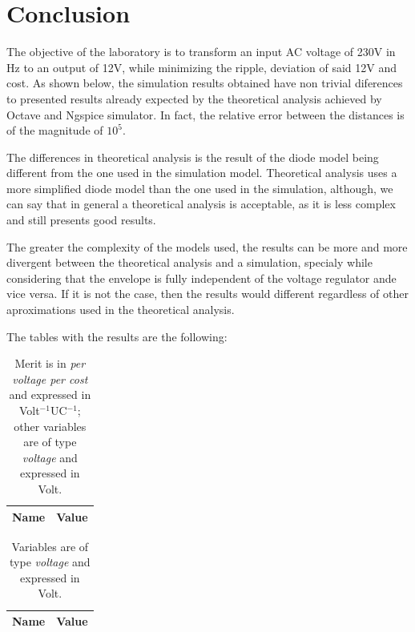 \section{Conclusion}
\label{sec:conclusion}

The objective of the laboratory is to transform an input AC voltage of 230V in Hz to an output of 12V, while minimizing the ripple, deviation of said 12V and cost. As shown below, the simulation results obtained have non trivial diferences to presented results already expected by the theoretical analysis achieved by Octave and Ngspice simulator. In fact, the relative error between the distances is of the magnitude of $10^5$.

The differences in theoretical analysis is the result of the diode model being different from the one used in the simulation model. Theoretical analysis uses a more simplified diode model than the one used in the simulation, although, we can say that in general a theoretical analysis is acceptable, as it is less complex and still presents good results.

The greater the complexity of the models used, the results can be more and more divergent between the theoretical analysis and a simulation, specialy while considering that the envelope is fully independent of the voltage regulator ande vice versa. If it is not the case, then the results would different regardless of other aproximations used in the theoretical analysis.

The tables with the results are the following:


\begin{table}[h]
 \centering
  \begin{tabular}{|l|r|}
    \hline    
    {\bf Name} & {\bf Value} \\ \hline
    
  \end{tabular}
  \caption{Merit is in {\it per voltage per cost} and expressed in Volt$^{-1}$UC$^{-1}$; other variables are of type {\it voltage} and expressed in Volt.}
  \label{tab:SIM_CONCLUSAO}
\end{table}

\begin{table}[h]
  \centering
  \begin{tabular}{|l|r|}
    \hline    
    {\bf Name} & {\bf Value} \\ \hline
    
  \end{tabular}
  \caption{Variables are of type {\em voltage} and expressed in Volt.}
  \label{tab:TEO_CONCLUSAO}
\end{table}

